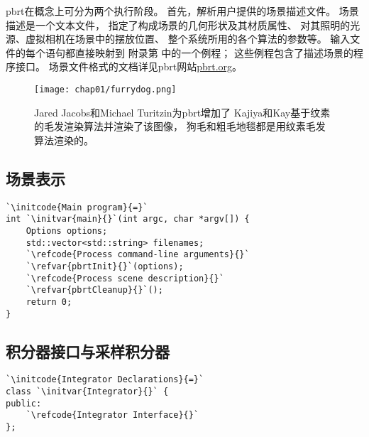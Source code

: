 pbrt在概念上可分为两个执行阶段。
首先，解析用户提供的场景描述文件。
场景描述是一个文本文件，
指定了构成场景的几何形状及其材质属性、
对其照明的光源、虚拟相机在场景中的摆放位置、
整个系统所用的各个算法的参数等。
输入文件的每个语句都直接映射到
附录第
中的一个例程；
这些例程包含了描述场景的程序接口。
场景文件格式的文档详见pbrt网站\href{https://pbrt.org/}{pbrt.org}。

\begin{figure}[ht]
    \centering\texttt{[image: chap01/furrydog.png]}
    \caption{Jared Jacobs和Michael Turitzin为pbrt增加了
        Kajiya和Kay基于纹素的毛发渲染算法\citep{10.1145/74333.74361}并渲染了该图像，
        狗毛和粗毛地毯都是用纹素毛发算法渲染的。}
    \label{fig:1.14}
\end{figure}


\subsection{场景表示}\label{sub:场景表示}

\begin{lstlisting}
`\initcode{Main program}{=}`
int `\initvar{main}{}`(int argc, char *argv[]) {
    Options options;
    std::vector<std::string> filenames;
    `\refcode{Process command-line arguments}{}` 
    `\refvar{pbrtInit}{}`(options);
    `\refcode{Process scene description}{}` 
    `\refvar{pbrtCleanup}{}`();
    return 0;
}
\end{lstlisting}

\subsection{积分器接口与采样积分器}\label{sub:积分器接口与采样积分器}

\begin{lstlisting}
`\initcode{Integrator Declarations}{=}`
class `\initvar{Integrator}{}` {
public:
    `\refcode{Integrator Interface}{}`
};
\end{lstlisting}